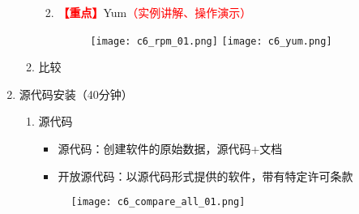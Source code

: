 \documentclass{TIJMUjiaoanLL}
\begin{document}
\begin{enumerate}
\begin{enumerate}
\begin{enumerate}
\begin{itemize}
	    \vspace*{-10pt}
	    \end{itemize}
	  \item \textcolor{red}{\textbf{【重点】}}Yum\textcolor{red}{（实例讲解、操作演示）}
	    \vspace*{-10pt}
	    \begin{figure}[h]
	      \centering
	      \texttt{[image: c6\_rpm\_01.png]}
	      \texttt{[image: c6\_yum.png]}
	    \end{figure}
	    \vspace*{-10pt}
	\end{enumerate}
      \item 比较
    \end{enumerate}

  \item 源代码安装（40分钟）
    \begin{enumerate}
      \item 源代码
	\begin{itemize}
	  \item 源代码：创建软件的原始数据，源代码+文档
	  \item 开放源代码：以源代码形式提供的软件，带有特定许可条款
	\end{itemize}


\otherTail
\newpage
\otherHeader


	    \vspace*{-10pt}
	    \begin{figure}[h]
	      \centering
	      \texttt{[image: c6\_compare\_all\_01.png]}
	    \end{figure}
	    \vspace*{-10pt}


\end{enumerate}
\end{enumerate}
\end{document}
